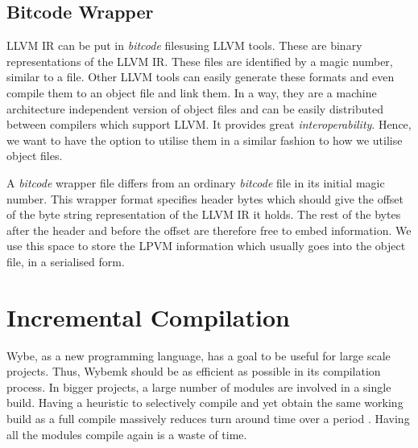 
\subsection{Bitcode Wrapper}

LLVM IR can be put in \textit{bitcode} files\footnotemark using LLVM
tools. These are binary representations of the LLVM IR. These files are
identified by a magic number, similar to a \macho file. Other LLVM tools can
easily generate these formats and even compile them to an object file and link
them. In a way, they are a machine architecture independent version of object
files and can be easily distributed between compilers which support LLVM. It
provides great \textit{interoperability}. Hence, we want to have the option to
utilise them in a similar fashion to how we utilise object files.

A \textit{bitcode} wrapper file differs from an ordinary \textit{bitcode} file
in its initial magic number. This wrapper format specifies header bytes which
should give the offset of the byte string representation of the LLVM IR it
holds. The rest of the bytes after the header and before the offset are
therefore free to embed information. We use this space to store the LPVM
information which usually goes into the object file, in a serialised form.




\section{Incremental Compilation}
\label{sec:incremental_compilation}

Wybe, as a new programming language, has a goal to be useful for large scale
projects. Thus, Wybemk should be as efficient as possible in its compilation
process. In bigger projects, a large number of modules are involved in a single
build. Having a heuristic to selectively compile and yet obtain the same
working build as a full compile massively reduces turn around time over a
period \citep{cost_of_recompilation}. Having all the modules compile again is a
waste of time.

